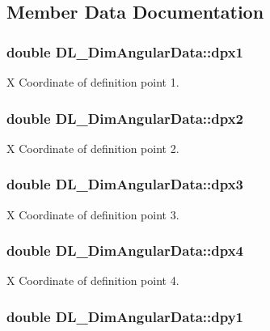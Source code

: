 \subsection{Member Data Documentation}
\hypertarget{structDL__DimAngularData_a6c0f9261e548ee8f83fba184fe2f68da}{
\subsubsection[{dpx1}]{\setlength{\rightskip}{0pt plus 5cm}double D\-L\-\_\-\-Dim\-Angular\-Data\-::dpx1}}\label{structDL__DimAngularData_a6c0f9261e548ee8f83fba184fe2f68da}
X Coordinate of definition point 1. \hypertarget{structDL__DimAngularData_a34636be73a8ac092e67485e9682ebd70}{
\subsubsection[{dpx2}]{\setlength{\rightskip}{0pt plus 5cm}double D\-L\-\_\-\-Dim\-Angular\-Data\-::dpx2}}\label{structDL__DimAngularData_a34636be73a8ac092e67485e9682ebd70}
X Coordinate of definition point 2. \hypertarget{structDL__DimAngularData_adb8ba734a623d799d7f8bb8807e09e50}{
\subsubsection[{dpx3}]{\setlength{\rightskip}{0pt plus 5cm}double D\-L\-\_\-\-Dim\-Angular\-Data\-::dpx3}}\label{structDL__DimAngularData_adb8ba734a623d799d7f8bb8807e09e50}
X Coordinate of definition point 3. \hypertarget{structDL__DimAngularData_a189163923f5a98a706d0866f481bd2e2}{
\subsubsection[{dpx4}]{\setlength{\rightskip}{0pt plus 5cm}double D\-L\-\_\-\-Dim\-Angular\-Data\-::dpx4}}\label{structDL__DimAngularData_a189163923f5a98a706d0866f481bd2e2}
X Coordinate of definition point 4. \hypertarget{structDL__DimAngularData_a2d64d2ea63b1c699f7dd690c2935a86b}{
\subsubsection[{dpy1}]{\setlength{\rightskip}{0pt plus 5cm}double D\-L\-\_\-\-Dim\-Angular\-Data\-::dpy1}}\label{structDL__DimAngularData_a2d64d2ea63b1c699f7dd690c2935a86b}
